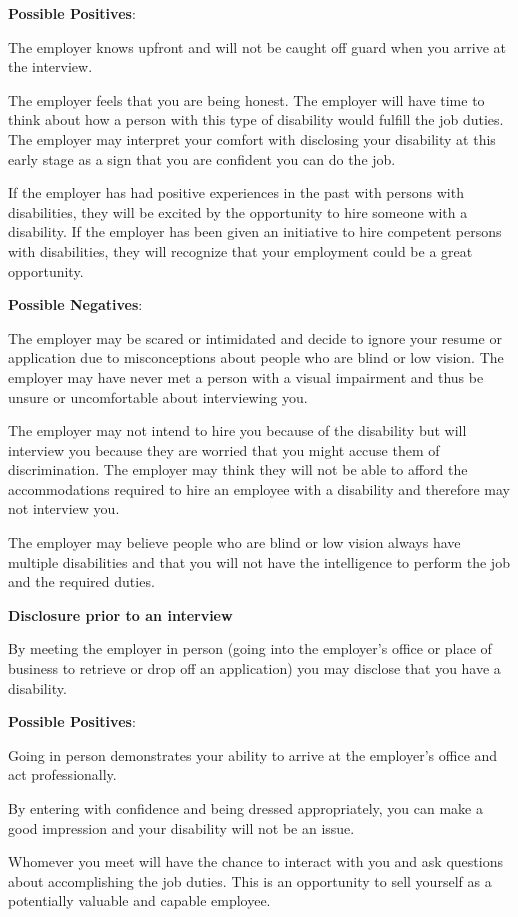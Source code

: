 \textbf{Possible Positives}:

The employer knows upfront and will not be caught off guard when you arrive at the interview.

The employer feels that you are being honest. The employer will have time to think about how a person with this type of disability would fulfill the job duties.
The employer may interpret your comfort with disclosing your disability at this early stage as a sign that you are confident you can do the job.

If the employer has had positive experiences in the past with persons with disabilities, they will be excited by the opportunity to hire someone with a disability.
If the employer has been given an initiative to hire competent persons with disabilities, they will recognize that your employment could be a great opportunity.

\textbf{Possible Negatives}:

The employer may be scared or intimidated and decide to ignore your resume or application due to misconceptions about people who are blind or low vision.
The employer may have never met a person with a visual impairment and thus be unsure or uncomfortable about interviewing you.

The employer may not intend to hire you because of the disability but will interview you because they are worried that you might accuse them of discrimination.
The employer may think they will not be able to afford the accommodations required to hire an employee with a disability and therefore may not interview you.
 
The employer may believe people who are blind or low vision always have multiple disabilities and that you will not have the intelligence to perform the job and the required duties.

\textbf{Disclosure prior to an interview}

By meeting the employer in person (going into the employer's office or place of business to retrieve or drop off an application) you may disclose that you have a disability.

\textbf{Possible Positives}:

Going in person demonstrates your ability to arrive at the employer's office and act professionally.

By entering with confidence and being dressed appropriately, you can make a good impression and your disability will not be an issue.

Whomever you meet will have the chance to interact with you and ask questions about accomplishing the job duties. This is an opportunity to sell yourself as a potentially valuable and capable employee.

